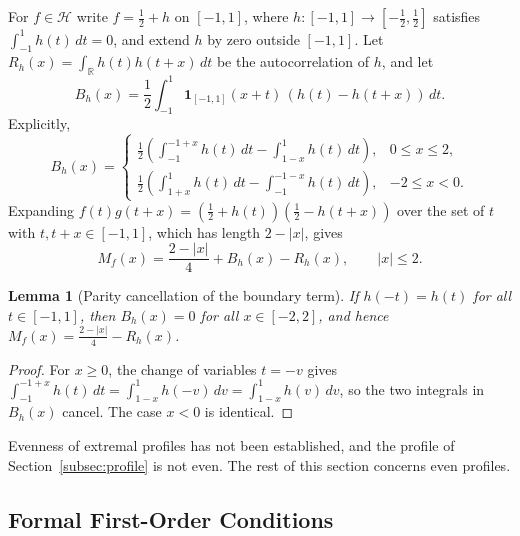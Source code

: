\documentclass[11pt,a4paper]{article}
\newtheorem{lemma}[theorem]{Lemma}
\theoremstyle{definition}
\theoremstyle{remark}
\newcommand{\R}{\mathbb{R}}
\begin{document}
For $f \in \mathcal{H}$ write $f = \frac{1}{2} + h$ on $[-1, 1]$, where $h: [-1, 1] \to [-\frac{1}{2}, \frac{1}{2}]$ satisfies $\int_{-1}^1 h(t) \, dt = 0$, and extend $h$ by zero outside $[-1, 1]$. Let $R_h(x) = \int_{\R} h(t) h(t+x) \, dt$ be the autocorrelation of $h$, and let
\begin{equation}
B_h(x) = \frac{1}{2} \int_{-1}^1 \mathbf{1}_{[-1, 1]}(x+t) \, (h(t) - h(t+x)) \, dt.
\end{equation}
Explicitly,
\begin{equation}
B_h(x) = \begin{cases} \frac{1}{2}\left(\int_{-1}^{-1+x} h(t) \, dt - \int_{1-x}^1 h(t) \, dt\right), & 0 \le x \le 2, \\[1ex] \frac{1}{2}\left(\int_{1+x}^1 h(t) \, dt - \int_{-1}^{-1-x} h(t) \, dt\right), & -2 \le x < 0. \end{cases}
\end{equation}
Expanding $f(t) g(t+x) = (\frac{1}{2} + h(t))(\frac{1}{2} - h(t+x))$ over the set of $t$ with $t, t + x \in [-1, 1]$, which has length $2 - |x|$, gives
\begin{equation}
\label{eq:centered}
M_f(x) = \frac{2 - |x|}{4} + B_h(x) - R_h(x), \qquad |x| \le 2.
\end{equation}

\begin{lemma}[Parity cancellation of the boundary term]
\label{lem:parity}
If $h(-t) = h(t)$ for all $t \in [-1, 1]$, then $B_h(x) = 0$ for all $x \in [-2, 2]$, and hence $M_f(x) = \frac{2 - |x|}{4} - R_h(x)$.
\end{lemma}
\begin{proof}
For $x \ge 0$, the change of variables $t = -v$ gives $\int_{-1}^{-1+x} h(t) \, dt = \int_{1-x}^1 h(-v) \, dv = \int_{1-x}^1 h(v) \, dv$, so the two integrals in $B_h(x)$ cancel. The case $x < 0$ is identical.
\end{proof}

Evenness of extremal profiles has not been established, and the profile of Section~\ref{subsec:profile} is not even. The rest of this section concerns even profiles.

\subsection{Formal First-Order Conditions}
\end{document}
